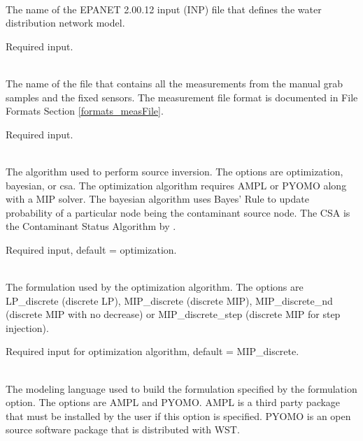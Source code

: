 \begin{description}[topsep=0pt,parsep=0.5em,itemsep=-0.4em]
  \item[{network}]\hfill
  \begin{description}[topsep=0pt,parsep=0.5em,itemsep=-0.4em]
    \item[{epanet file}]\hfill
\\ The name of the EPANET 2.00.12 input (INP) file that defines the water distribution
                network model.
                
                Required input.
  \end{description}
  \item[{measurements}]\hfill
  \begin{description}[topsep=0pt,parsep=0.5em,itemsep=-0.4em]
    \item[{grab samples}]\hfill
\\The name of the file that contains all the measurements from 
                the manual grab samples and the fixed sensors. The measurement file 
                format is documented in File Formats Section \ref{formats_measFile}.

                Required input.
  \end{description}
  \item[{inversion}]\hfill
  \begin{description}[topsep=0pt,parsep=0.5em,itemsep=-0.4em]
    \item[{algorithm}]\hfill
\\The algorithm used to perform source inversion. The options are 
				optimization, bayesian, or csa. The optimization algorithm requires 
				AMPL or PYOMO along with a MIP solver. The bayesian algorithm 
				uses Bayes' Rule to update probability of a particular node 
				being the contaminant source node. The CSA is the Contaminant
                                Status Algorithm by \citet{csa}.
                
                Required input, default = optimization.
    \item[{formulation}]\hfill
\\The formulation used by the optimization algorithm. The options are 
                LP\_discrete (discrete LP), MIP\_discrete (discrete MIP), 
                MIP\_discrete\_nd (discrete MIP with no decrease) or 
                MIP\_discrete\_step (discrete MIP for step injection).
                
                Required input for optimization algorithm, default = MIP\_discrete.
    \item[{model format}]\hfill
\\The modeling language used to build the formulation specified
                by the formulation option. The options are AMPL and PYOMO. 
				AMPL is a third party package that must be installed by 
				the user if this option is specified. PYOMO is an open source 
				software package that is distributed with WST.
                

\end{description}
\end{description}
